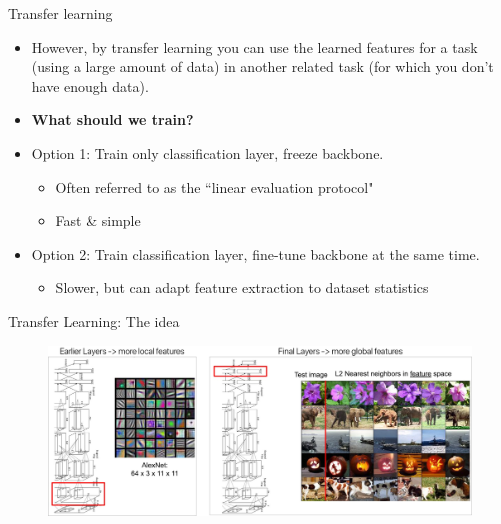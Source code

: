 \documentclass[serif, aspectratio=169]{beamer}
\begin{document}
\begin{frame}{Transfer learning}
	\begin{itemize}
		\item However, by transfer learning you can use the learned features for a task (using a large amount of data) in another related task (for which you don't have enough data).
		\item \textbf{What should we train?}
		\item Option 1: Train only classification layer, freeze backbone.

		\begin{itemize}
			\item Often referred to as the ``linear evaluation protocol"
			\item Fast \& simple
		\end{itemize}
		\item Option 2: Train classification layer, fine-tune backbone at the same time.

		\begin{itemize}
			\item Slower, but can adapt feature extraction to dataset statistics
		\end{itemize}
	\end{itemize}
\end{frame}

\begin{frame}{Transfer Learning: The idea}
	\vspace{-1em}
	\begin{figure}[htpb]
		\begin{center}
			\includegraphics[keepaspectratio, scale=0.23]{pic/TL_alexnet}
		\end{center}
	\end{figure}
\end{frame}
\end{document}

